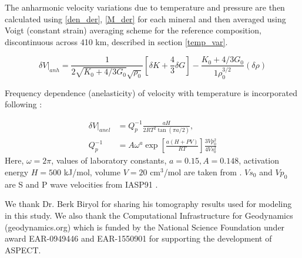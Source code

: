 \documentclass[draft,linenumbers]{agujournal2018}
\begin{document}
The anharmonic velocity variations due to temperature and pressure are then calculated using \ref{den_der}, \ref{M_der} for each mineral and then averaged using Voigt (constant strain) averaging scheme for the reference composition, discontinuous across 410 km,  described in section \ref{temp_var}.

\begin{equation} \label{anh}
    \delta V \vert_{anh} = \frac{1}{2\sqrt{K_0 + 4/3 G_0} \sqrt{\rho_0}} \left[\delta K + \frac{4}{3} \delta G \right] - \frac{K_0 + 4/3 G_0}{1\rho_0^{3/2}} ( \delta \rho)
\end{equation} 

Frequency dependence (anelasticity) of velocity with temperature is incorporated following \citet{Goes_2000}:

\begin{align} \label{anel}
    \delta V \vert_{anel} &= Q_p^{-1} \frac{aH}{2 R T^2 \tan(\pi a/2)},\\
    Q_p^{-1} &= A \omega^{a} \exp \left[ \frac{a(H+PV)}{RT} \right] \frac{3Vp_{0}^{2}}{4Vs_{0}^{2}} \nonumber
\end{align}
Here, $\omega = 2\pi $, values of laboratory constants, $a = 0.15, A = 0.148$, activation energy $H = 500$ kJ/mol, volume $V = 20$ cm$^3$/mol are taken from \citet{sobolev1996upper}. $Vs_0$ and $Vp_0$ are S and P wave velocities from IASP91 \citep{kennett1991traveltimes}.



\acknowledgments
We thank Dr. Berk Biryol for sharing his tomography results used for modeling in this study. We also thank the Computational Infrastructure for Geodynamics (geodynamics.org) which is funded by the National Science Foundation under award EAR-0949446 and EAR-1550901 for supporting the development of ASPECT.



%

%





\end{document}
